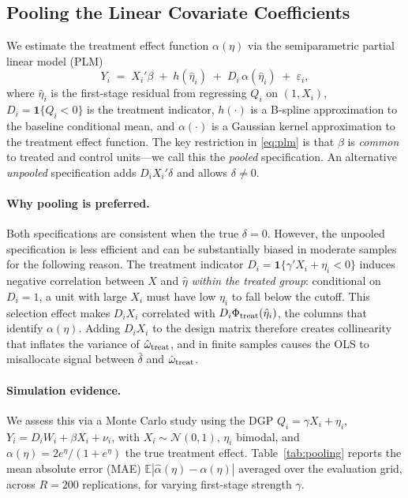 \subsection*{Pooling the Linear Covariate Coefficients}

We estimate the treatment effect function $\alpha(\eta)$ via the semiparametric
partial linear model (PLM)
\begin{equation}\label{eq:plm}
  Y_i \;=\; X_i'\beta \;+\; h(\hat\eta_i) \;+\; D_i\,\alpha(\hat\eta_i) \;+\; \varepsilon_i,
\end{equation}
where $\hat\eta_i$ is the first-stage residual from regressing $Q_i$ on
$(1, X_i)$, $D_i = \mathbf{1}\{Q_i < 0\}$ is the treatment indicator,
$h(\cdot)$ is a B-spline approximation to the baseline conditional mean, and
$\alpha(\cdot)$ is a Gaussian kernel approximation to the treatment effect
function.
The key restriction in \eqref{eq:plm} is that $\beta$ is \emph{common} to
treated and control units---we call this the \emph{pooled} specification.
An alternative \emph{unpooled} specification adds $D_i X_i'\delta$ and allows
$\delta \neq 0$.

\paragraph{Why pooling is preferred.}
Both specifications are consistent when the true $\delta = 0$.
However, the unpooled specification is less efficient and can be substantially
biased in moderate samples for the following reason.
The treatment indicator $D_i = \mathbf{1}\{\gamma'X_i + \eta_i < 0\}$ induces
negative correlation between $X$ and $\hat\eta$ \emph{within the treated group}:
conditional on $D_i = 1$, a unit with large $X_i$ must have low $\eta_i$ to
fall below the cutoff.
This selection effect makes $D_i X_i$ correlated with $D_i \Phi_{\rm treat}(\hat\eta_i)$,
the columns that identify $\alpha(\eta)$.
Adding $D_i X_i$ to the design matrix therefore creates collinearity that
inflates the variance of $\hat\omega_{\rm treat}$, and in finite samples causes
the OLS to misallocate signal between $\hat\delta$ and $\hat\omega_{\rm treat}$.

\paragraph{Simulation evidence.}
We assess this via a Monte Carlo study using the DGP
$Q_i = \gamma X_i + \eta_i$, $Y_i = D_i W_i + \beta X_i + \nu_i$,
with $X_i \sim \mathcal{N}(0,1)$, $\eta_i$ bimodal, and
$\alpha(\eta) = 2e^\eta/(1+e^\eta)$ the true treatment effect.
Table~\ref{tab:pooling} reports the mean absolute error (MAE)
$\mathbb{E}|\hat\alpha(\eta) - \alpha(\eta)|$ averaged over the evaluation grid,
across $R = 200$ replications, for varying first-stage strength $\gamma$.


